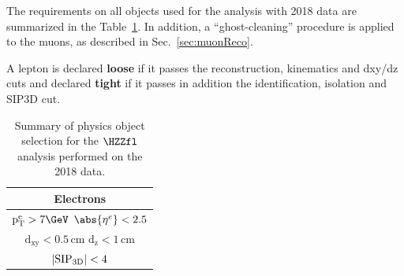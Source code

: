 The requirements on all objects used for the analysis with 2018 data are summarized in the Table~\ref{tab:objsummary}. In addition, a ``ghost-cleaning'' procedure is applied to the muons, as described in Sec.~\ref{sec:muonReco}. 

A lepton is declared {\bf loose} if it passes the reconstruction, kinematics and dxy/dz cuts and declared {\bf tight} if it passes in addition the identification, isolation and SIP3D cut. 

\renewcommand{\arraystretch}{2}
\begin{table}[H]
	\small
	\centering
	\caption{Summary of physics object selection for the $\HZZfl$ analysis performed on the 2018 data.}
	\label{tab:objsummary}
	\begin{tabular}{|c|c|}
		\hline \hline
		\multicolumn{2}{|c|}{\textbf{Electrons}}                                                                                                                                                                                    \\ \hline
		\multicolumn{2}{|c|}{$\mathrm{p_T^e} > 7 \GeV$ \hspace{0.5cm} $\abs{\eta^e} < 2.5$}                                                                                                                                               \\
		\multicolumn{2}{|c|}{$\mathrm{d_{xy}} < 0.5 \, \mathrm{cm}$ \hspace{0.5cm} $\mathrm{d_{z}} < 1 \, \mathrm{cm}$}                                                                                                                           \\
		\multicolumn{2}{|c|}{$| {\rm SIP_{3D}} | < 4$ }                                                                                                                                                                                   \\

\end{tabular}
\end{table}
